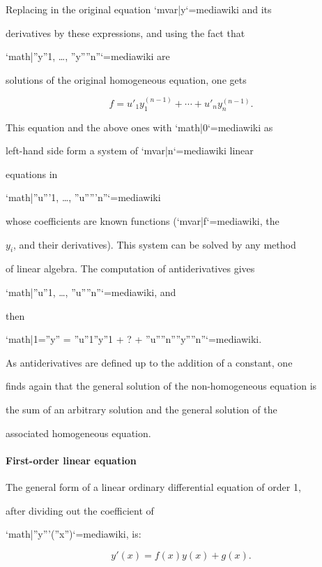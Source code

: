 Replacing in the original equation `{{mvar|y}}`{=mediawiki} and its

derivatives by these expressions, and using the fact that

`{{math|''y''1, …, ''y''''n''}}`{=mediawiki} are

solutions of the original homogeneous equation, one gets



$$f=u'_1y_1^{(n-1)} + \cdots + u'_ny_n^{(n-1)}.$$



This equation and the above ones with `{{math|0}}`{=mediawiki} as

left-hand side form a system of `{{mvar|n}}`{=mediawiki} linear

equations in

`{{math|''u'''1, …, ''u'''''n''}}`{=mediawiki}

whose coefficients are known functions (`{{mvar|f}}`{=mediawiki}, the

$y_i$, and their derivatives). This system can be solved by any method

of linear algebra. The computation of antiderivatives gives

`{{math|''u''1, …, ''u''''n''}}`{=mediawiki}, and

then

`{{math|1=''y'' = ''u''1''y''1 + ? + ''u''''n''''y''''n''}}`{=mediawiki}.



As antiderivatives are defined up to the addition of a constant, one

finds again that the general solution of the non-homogeneous equation is

the sum of an arbitrary solution and the general solution of the

associated homogeneous equation.



\paragraph{First-order linear equation}



The general form of a linear ordinary differential equation of order 1,

after dividing out the coefficient of

`{{math|''y'''(''x'')}}`{=mediawiki}, is:



$$y'(x) = f(x) y(x) + g(x).$$




